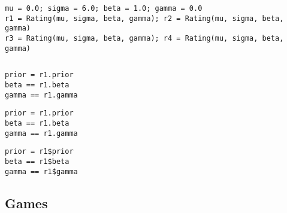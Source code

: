 \documentclass[article]{jss}
\newif\ifen
\newif\ifes
\newcommand{\en}[1]{\ifen#1\fi}
\newcommand{\es}[1]{\ifes#1\fi}
\begin{document}
\en{The class \texttt{Rating()} is represented by: the mean (\texttt{mu}) and the deviation (\texttt{sigma}) of the prior Gaussian distribution; the performance standard deviation (\texttt{beta}); and the temporal volatility of the skills (\texttt{gamma}).}
\es{La clase \texttt{Rating()} se representa con cuatro atributos: la media (\texttt{mu}) y el desvío (\texttt{sigma}) de la distribuci\'on Gaussiana a priori; el devío de los rendimientos (\texttt{beta}); y la volatilidad temporal de las habilidades (\texttt{gamma}).}
%
\begin{lstlisting}[backgroundcolor=\color{white},label=lst:rating, caption=\relax, belowskip=-1.0 \baselineskip, aboveskip=-0 \baselineskip]
\end{lstlisting}
\begin{lstlisting}[backgroundcolor=\color{all}]
mu = 0.0; sigma = 6.0; beta = 1.0; gamma = 0.0
r1 = Rating(mu, sigma, beta, gamma); r2 = Rating(mu, sigma, beta, gamma)
r3 = Rating(mu, sigma, beta, gamma); r4 = Rating(mu, sigma, beta, gamma)
\end{lstlisting}  
%
\en{For efficiency, the prior is stored pre-computed.}
\es{Por cuesti\'on de eficiencia, el prior Gaussiano se guarda precomputado.}
%
\begin{lstlisting}[backgroundcolor=\color{white},label=lst:prior, caption=\relax, belowskip=-1.0 \baselineskip, aboveskip=-0 \baselineskip]
\end{lstlisting}
\begin{paracol}{3}
\begin{lstlisting}[backgroundcolor=\color{julia}]
prior = r1.prior
beta == r1.beta
gamma == r1.gamma
\end{lstlisting}
\switchcolumn
\begin{lstlisting}[backgroundcolor=\color{python}]
prior = r1.prior
beta == r1.beta
gamma == r1.gamma
\end{lstlisting}
\switchcolumn
\begin{lstlisting}[backgroundcolor=\color{r}]
prior = r1$prior
beta == r1$beta
gamma == r1$gamma
\end{lstlisting}
\end{paracol}
%

\subsection{Games} \label{sec:game}
\end{document}
